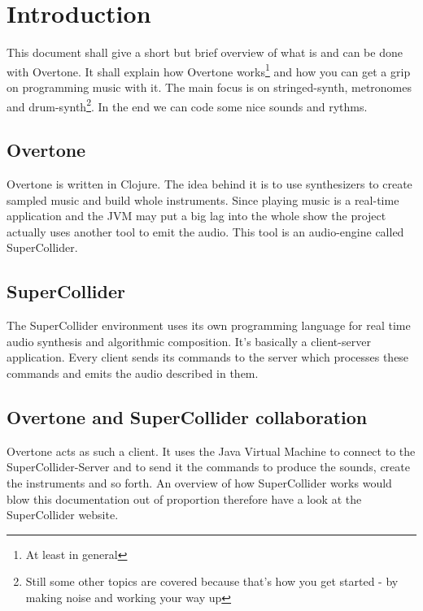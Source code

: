 

\chapter{Introduction}
This document shall give a short but brief overview of what is and can be done with \gls{Overtone}. It shall explain how Overtone works\footnote{At least in general} and how you can get a grip on programming music with it. The main focus is on stringed-synth, metronomes and drum-synth\footnote{Still some other topics are covered because that's how you get started - by making noise and working your way up}. In the end we can code some nice sounds and rythms.

\section{Overtone}
\gls{Overtone} is written in \gls{Clojure}. The idea behind it is to use synthesizers to create sampled music and build whole instruments. Since playing music is a real-time application and the \gls{JVM} may put a big lag into the whole show the project actually uses another tool to emit the audio. This tool is an audio-engine called SuperCollider. 

\section{SuperCollider}
The SuperCollider environment uses its own programming language for real time audio synthesis and algorithmic composition. It's basically a client-server application. Every client sends its commands to the server which processes these commands and emits the audio described in them.

\section{Overtone and SuperCollider collaboration}
Overtone acts as such a client. It uses the Java Virtual Machine to connect to the SuperCollider-Server and to send it the commands to produce the sounds, create the instruments and so forth.
An overview of how SuperCollider works would blow this documentation out of proportion therefore have a look at the SuperCollider website\cite{scw}.

